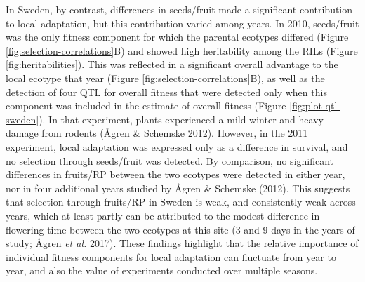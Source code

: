 \documentclass[]{article}
\begin{document}
In Sweden, by contrast, differences in seeds/fruit made a significant contribution to local adaptation, but this contribution varied among years. In 2010, seeds/fruit was the only fitness component for which the parental ecotypes differed (Figure \ref{fig:selection-correlations}B) and showed high heritability among the RILs (Figure \ref{fig:heritabilities}). This was reflected in a significant overall advantage to the local ecotype that year (Figure \ref{fig:selection-correlations}B), as well as the detection of four QTL for overall fitness that were detected only when this component was included in the estimate of overall fitness (Figure \ref{fig:plot-qtl-sweden}). In that experiment, plants experienced a mild winter and heavy damage from rodents (Ågren \& Schemske 2012). However, in the 2011 experiment, local adaptation was expressed only as a difference in survival, and no selection through seeds/fruit was detected. By comparison, no significant differences in fruits/RP between the two ecotypes were detected in either year, nor in four additional years studied by Ågren \& Schemske (2012). This suggests that selection through fruits/RP in Sweden is weak, and consistently weak across years, which at least partly can be attributed to the modest difference in flowering time between the two ecotypes at this site (3 and 9 days in the years of study; Ågren \emph{et al.} 2017). These findings highlight that the relative importance of individual fitness components for local adaptation can fluctuate from year to year, and also the value of experiments conducted over multiple seasons.
\end{document}
